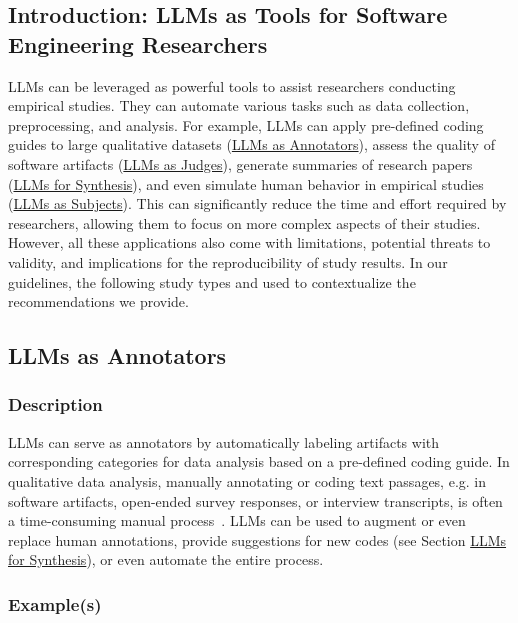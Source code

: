 



\subsection{Introduction: LLMs as Tools for Software Engineering Researchers}

LLMs can be leveraged as powerful tools to assist researchers conducting empirical studies.
They can automate various tasks such as data collection, preprocessing, and analysis.
For example, LLMs can apply pre-defined coding guides to large qualitative datasets (\href{/study-types/#llms-as-annotators}{LLMs as Annotators}), assess the quality of software artifacts (\href{/study-types/#llms-as-judges}{LLMs as Judges}), generate summaries of research papers (\href{/study-types/#llms-for-synthesis}{LLMs for Synthesis}), and even simulate human behavior in empirical studies (\href{/study-types/#llms-as-subjects}{LLMs as Subjects}).
This can significantly reduce the time and effort required by researchers, allowing them to focus on more complex aspects of their studies.
However, all these applications also come with limitations, potential threats to validity, and implications for the reproducibility of study results.
In our guidelines, the following study types and used to contextualize the recommendations we provide.


\subsection{LLMs as Annotators}

\subsubsection{Description}

LLMs can serve as annotators by automatically labeling artifacts with corresponding categories for data analysis based on a pre-defined coding guide.
In qualitative data analysis, manually annotating or coding text passages, e.g. in software artifacts, open-ended survey responses, or interview transcripts, is often a time-consuming manual process~\cite{DBLP:journals/ase/BanoHZT24}.
LLMs can be used to augment or even replace human annotations, provide suggestions for new codes (see Section \href{/study-types/#llms-for-synthesis}{LLMs for Synthesis}), or even automate the entire process.

\subsubsection{Example(s)}

